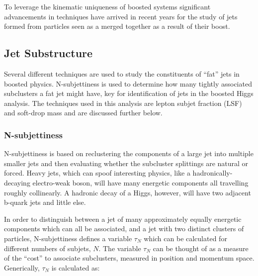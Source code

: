 To leverage the kinematic uniqueness of boosted systems significant advancements in techniques have arrived in recent years for the study of jets formed from particles seen as a merged together as a result of their boost.

\subsection{Jet Substructure}

Several different techniques are used to study the constituents of ``fat'' jets in boosted physics. N-subjettiness is used to determine how many tightly associated subclusters a fat jet might have, key for identification of \bbbar jets in the boosted Higgs analysis. The techniques used in this analysis are lepton subjet fraction (LSF) and soft-drop mass and are discussed further below.

\subsubsection{N-subjettiness}

N-subjettiness is based on reclustering the components of a large jet into multiple smaller jets and then evaluating whether the subcluster splittings are natural or forced. Heavy \QCD jets, which can spoof interesting physics, like a hadronically-decaying electro-weak boson, will have many energetic components all travelling roughly collinearly.  A hadronic decay of a Higgs, however, will have two adjacent b-quark jets and little else.

In order to distinguish between a jet of many approximately equally energetic components which can all be associated, and a jet with two distinct clusters of particles, N-subjettiness defines a variable $\tau_{N}$ which can be calculated for different numbers of subjets, $N$. The variable $\tau_{N}$ can be thought of as a measure of the ``cost'' to associate subclusters, measured in position and momentum space. Generically, $\tau_{N}$ is calculated as:

